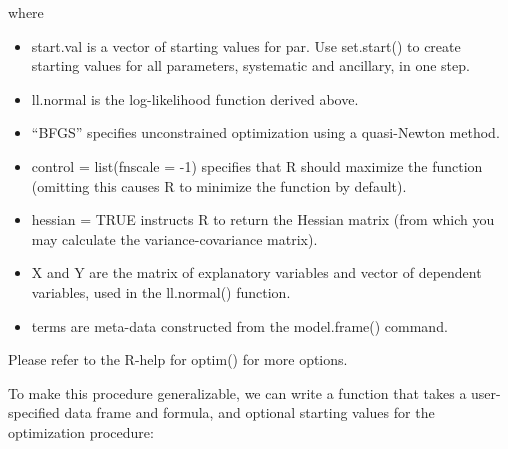 \documentclass[letterpaper,10pt,english]{sphinxmanual}
\begin{document}
where
\begin{itemize}
\item {} 
start.val is a vector of starting values for par. Use set.start() to
create starting values for all parameters, systematic and ancillary,
in one step.

\item {} 
ll.normal is the log-likelihood function derived above.

\item {} 
“BFGS” specifies unconstrained optimization using a quasi-Newton
method.

\item {} 
control = list(fnscale = -1) specifies that R should maximize the
function (omitting this causes R to minimize the function by
default).

\item {} 
hessian = TRUE instructs R to return the Hessian matrix (from which
you may calculate the variance-covariance matrix).

\item {} 
X and Y are the matrix of explanatory variables and vector of
dependent variables, used in the ll.normal() function.

\item {} 
terms are meta-data constructed from the model.frame() command.

\end{itemize}

Please refer to the R-help for optim() for more options.

To make this procedure generalizable, we can write a function that takes
a user-specified data frame and formula, and optional starting values
for the optimization procedure:
\end{document}
